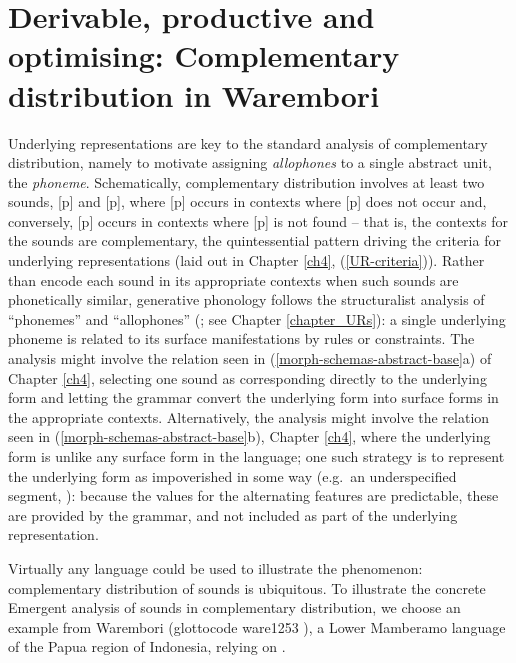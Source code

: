 \section[Complementary distribution in Warembori]{Derivable, productive and optimising: Complementary distribution in Warembori }\label{section_allophone}\label{Warembori_section}\label{section_Warembori}
\largerpage[-1]
Underlying representations are key to the standard analysis of complementary distribution, namely to motivate assigning {\it allophones} to a single abstract unit, the {\it phoneme}. Schematically, complementary distribution involves at least two sounds, [p] and [p], where [p] occurs in contexts where [p] does not occur and, conversely,  [p] occurs in contexts where  [p] is not found -- that is, the contexts for the sounds are complementary, the quintessential pattern driving the criteria for underlying representations (laid out in Chapter \ref{ch4}, (\ref{UR-criteria})). Rather than encode each sound in its appropriate contexts when such sounds are phonetically similar, generative phonology follows the structuralist analysis of ``phonemes'' and ``allophones'' (\citealt{Bloomfield:1926, Sapir:1933, Twaddell:1935, Bloch:1948}; see Chapter \ref{chapter_URs}): a single underlying phoneme is related to its surface manifestations by rules or constraints. The analysis might involve the relation seen in  (\ref{morph-schemas-abstract-base}a) of Chapter \ref{ch4}, selecting one sound as corresponding directly to  the underlying form and letting the grammar convert the underlying form into surface forms in the appropriate contexts. Alternatively, the analysis might involve the relation seen in (\ref{morph-schemas-abstract-base}b), Chapter \ref{ch4}, where the underlying form is unlike any surface form in the language; one such strategy is to represent the underlying form as impoverished in some way (e.g.\  an underspecified segment, \citealt{Archangeli:1984, Archangeli:1988, Pulleyblank:1986}):  because the values for the alternating features are predictable, these are provided by the grammar, and not included as part of the underlying representation.  

Virtually any language could be used to illustrate the phenomenon: complementary distribution of sounds is ubiquitous. To illustrate the concrete Emergent analysis of sounds in complementary distribution, we choose an example  from Warembori (glottocode ware1253%
), a Lower Mamberamo language of the Papua region of Indonesia, relying on \citet{Donohue:1999}.

